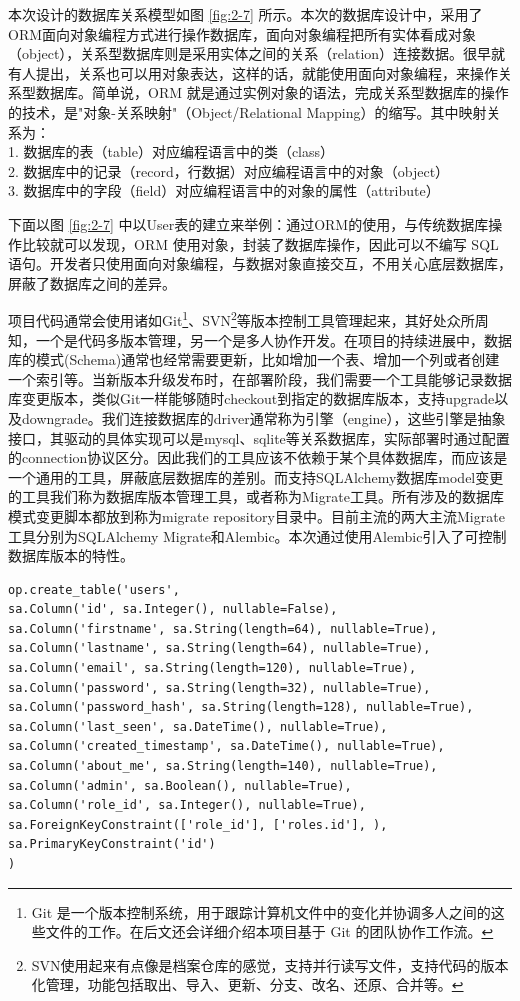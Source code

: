 本次设计的数据库关系模型如图 \ref{fig:2-7} 所示。本次的数据库设计中，采用了ORM面向对象编程方式进行操作数据库，面向对象编程把所有实体看成对象（object），关系型数据库则是采用实体之间的关系（relation）连接数据。很早就有人提出，关系也可以用对象表达，这样的话，就能使用面向对象编程，来操作关系型数据库。简单说，ORM 就是通过实例对象的语法，完成关系型数据库的操作的技术，是"对象-关系映射"（Object/Relational Mapping）的缩写。其中映射关系为：
\\ 1. 数据库的表（table）对应编程语言中的类（class）
\\ 2. 数据库中的记录（record，行数据）对应编程语言中的对象（object） 
\\ 3. 数据库中的字段（field）对应编程语言中的对象的属性（attribute）

下面以图 \ref{fig:2-7} 中以User表的建立来举例：通过ORM的使用，与传统数据库操作比较就可以发现，ORM 使用对象，封装了数据库操作，因此可以不编写 SQL 语句。开发者只使用面向对象编程，与数据对象直接交互，不用关心底层数据库，屏蔽了数据库之间的差异。

项目代码通常会使用诸如Git\footnote{Git 是一个版本控制系统，用于跟踪计算机文件中的变化并协调多人之间的这些文件的工作。在后文还会详细介绍本项目基于 Git 的团队协作工作流。}、SVN\footnote{SVN使用起来有点像是档案仓库的感觉，支持并行读写文件，支持代码的版本化管理，功能包括取出、导入、更新、分支、改名、还原、合并等。}等版本控制工具管理起来，其好处众所周知，一个是代码多版本管理，另一个是多人协作开发。在项目的持续进展中，数据库的模式(Schema)通常也经常需要更新，比如增加一个表、增加一个列或者创建一个索引等。当新版本升级发布时，在部署阶段，我们需要一个工具能够记录数据库变更版本，类似Git一样能够随时checkout到指定的数据库版本，支持upgrade以及downgrade。我们连接数据库的driver通常称为引擎（engine），这些引擎是抽象接口，其驱动的具体实现可以是mysql、sqlite等关系数据库，实际部署时通过配置的connection协议区分。因此我们的工具应该不依赖于某个具体数据库，而应该是一个通用的工具，屏蔽底层数据库的差别。而支持SQLAlchemy数据库model变更的工具我们称为数据库版本管理工具，或者称为Migrate工具。所有涉及的数据库模式变更脚本都放到称为migrate repository目录中。目前主流的两大主流Migrate工具分别为SQLAlchemy Migrate和Alembic。本次通过使用Alembic引入了可控制数据库版本的特性。

\begin{lstlisting}
op.create_table('users',
sa.Column('id', sa.Integer(), nullable=False),
sa.Column('firstname', sa.String(length=64), nullable=True),
sa.Column('lastname', sa.String(length=64), nullable=True),
sa.Column('email', sa.String(length=120), nullable=True),
sa.Column('password', sa.String(length=32), nullable=True),
sa.Column('password_hash', sa.String(length=128), nullable=True),
sa.Column('last_seen', sa.DateTime(), nullable=True),
sa.Column('created_timestamp', sa.DateTime(), nullable=True),
sa.Column('about_me', sa.String(length=140), nullable=True),
sa.Column('admin', sa.Boolean(), nullable=True),
sa.Column('role_id', sa.Integer(), nullable=True),
sa.ForeignKeyConstraint(['role_id'], ['roles.id'], ),
sa.PrimaryKeyConstraint('id')
)
\end{lstlisting}

